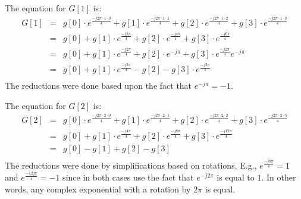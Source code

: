The equation for $G[1]$ is:
\begin{equation}
\begin{array} {lll} 
G[1] & = & g[0] \cdot e^{\frac{-j 2 \pi \cdot 1 \cdot 0}{4}} + g[1] \cdot e^{\frac{-j 2 \pi \cdot 1 \cdot 1}{4}} + g[2] \cdot e^{\frac{-j 2 \pi \cdot 1 \cdot 2}{4}} + g[3] \cdot e^{\frac{-j 2 \pi \cdot 1 \cdot 3}{4}}\\
 & = & g[0] + g[1] \cdot e^{\frac{-j 2 \pi}{4}} + g[2] \cdot e^{\frac{-j 4 \pi}{4}} + g[3] \cdot e^{\frac{-j 6 \pi}{4}}\\
 & = & g[0] + g[1] \cdot e^{\frac{-j 2 \pi}{4}} + g[2] \cdot e^{-j \pi}   + g[3] \cdot e^{\frac{-j 2 \pi}{4}} e^{-j \pi} \\
 & = & g[0] + g[1] \cdot e^{\frac{-j 2 \pi}{4}} - g[2] - g[3] \cdot e^{\frac{-j 2 \pi}{4}}\\
\end{array} 
\end{equation} The reductions were done based upon the fact that $e^{-j \pi} = -1$. 

The equation for $G[2]$ is:
\begin{equation}
\begin{array} {lll} 
G[2] & = & g[0] \cdot e^{\frac{-j 2 \pi \cdot 2 \cdot 0}{4}} + g[1] \cdot e^{\frac{-j 2 \pi \cdot 2 \cdot 1}{4}} + g[2] \cdot e^{\frac{-j 2 \pi \cdot 2 \cdot 2}{4}} + g[3] \cdot e^{\frac{-j 2 \pi \cdot 2 \cdot 3}{4}}\\
 & = & g[0] + g[1] \cdot e^{\frac{-j 4 \pi}{4}} + g[2] \cdot e^{\frac{-j 8 \pi}{4}} + g[3] \cdot e^{\frac{-j 12 \pi}{4}}\\
 & = & g[0] - g[1]  + g[2] -  g[3] \\
\end{array} 
\end{equation} The reductions were done by simplifications based on rotations. E.g., $e^{\frac{-j 8 \pi}{4}} = 1$ and $e^{\frac{-12 j \pi}{4}} = -1$ since in both cases use the fact that $e^{-j 2\pi}$ is equal to $1$. In other words, any complex exponential with a rotation by $2 \pi$ is equal.

